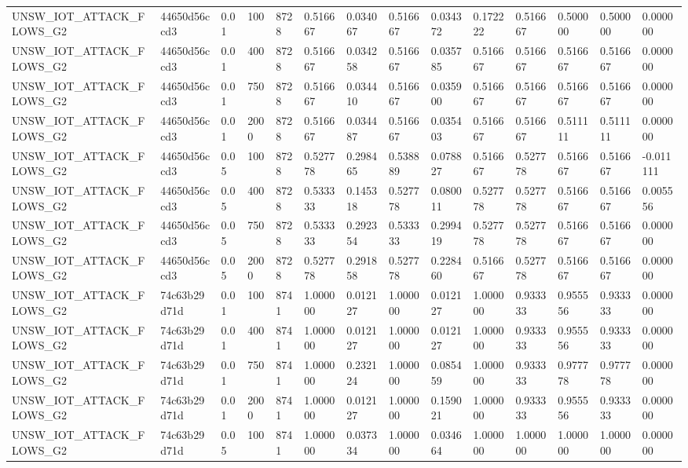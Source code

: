 \begin{tabular}{llllllllllllll}
UNSW\_IOT\_ATTACK\_FLOWS\_G2 & 44650d56ccd3 & 0.01 & 100 & 8728 & 0.516667 & 0.034067 & 0.516667 & 0.034372 & 0.172222 & 0.516667 & 0.500000 & 0.500000 & 0.000000 \\
UNSW\_IOT\_ATTACK\_FLOWS\_G2 & 44650d56ccd3 & 0.01 & 400 & 8728 & 0.516667 & 0.034258 & 0.516667 & 0.035785 & 0.516667 & 0.516667 & 0.516667 & 0.516667 & 0.000000 \\
UNSW\_IOT\_ATTACK\_FLOWS\_G2 & 44650d56ccd3 & 0.01 & 750 & 8728 & 0.516667 & 0.034410 & 0.516667 & 0.035900 & 0.516667 & 0.516667 & 0.516667 & 0.516667 & 0.000000 \\
UNSW\_IOT\_ATTACK\_FLOWS\_G2 & 44650d56ccd3 & 0.01 & 2000 & 8728 & 0.516667 & 0.034487 & 0.516667 & 0.035403 & 0.516667 & 0.516667 & 0.511111 & 0.511111 & 0.000000 \\
UNSW\_IOT\_ATTACK\_FLOWS\_G2 & 44650d56ccd3 & 0.05 & 100 & 8728 & 0.527778 & 0.298465 & 0.538889 & 0.078827 & 0.516667 & 0.527778 & 0.516667 & 0.516667 & -0.011111 \\
UNSW\_IOT\_ATTACK\_FLOWS\_G2 & 44650d56ccd3 & 0.05 & 400 & 8728 & 0.533333 & 0.145318 & 0.527778 & 0.080011 & 0.527778 & 0.527778 & 0.516667 & 0.516667 & 0.005556 \\
UNSW\_IOT\_ATTACK\_FLOWS\_G2 & 44650d56ccd3 & 0.05 & 750 & 8728 & 0.533333 & 0.292354 & 0.533333 & 0.299419 & 0.527778 & 0.527778 & 0.516667 & 0.516667 & 0.000000 \\
UNSW\_IOT\_ATTACK\_FLOWS\_G2 & 44650d56ccd3 & 0.05 & 2000 & 8728 & 0.527778 & 0.291858 & 0.527778 & 0.228460 & 0.516667 & 0.527778 & 0.516667 & 0.516667 & 0.000000 \\
UNSW\_IOT\_ATTACK\_FLOWS\_G2 & 74c63b29d71d & 0.01 & 100 & 8741 & 1.000000 & 0.012127 & 1.000000 & 0.012127 & 1.000000 & 0.933333 & 0.955556 & 0.933333 & 0.000000 \\
UNSW\_IOT\_ATTACK\_FLOWS\_G2 & 74c63b29d71d & 0.01 & 400 & 8741 & 1.000000 & 0.012127 & 1.000000 & 0.012127 & 1.000000 & 0.933333 & 0.955556 & 0.933333 & 0.000000 \\
UNSW\_IOT\_ATTACK\_FLOWS\_G2 & 74c63b29d71d & 0.01 & 750 & 8741 & 1.000000 & 0.232124 & 1.000000 & 0.085459 & 1.000000 & 0.933333 & 0.977778 & 0.977778 & 0.000000 \\
UNSW\_IOT\_ATTACK\_FLOWS\_G2 & 74c63b29d71d & 0.01 & 2000 & 8741 & 1.000000 & 0.012127 & 1.000000 & 0.159021 & 1.000000 & 0.933333 & 0.955556 & 0.933333 & 0.000000 \\
UNSW\_IOT\_ATTACK\_FLOWS\_G2 & 74c63b29d71d & 0.05 & 100 & 8741 & 1.000000 & 0.037334 & 1.000000 & 0.034664 & 1.000000 & 1.000000 & 1.000000 & 1.000000 & 0.000000 \\

\end{tabular}
